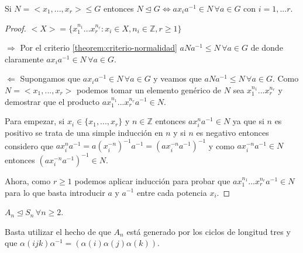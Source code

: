 \begin{proposition}
Si $N = <x_1,...,x_r>  \le G$ entonces $N \unlhd G \iff ax_ia^{-1} \in N \, \forall a \in G$ con $i = 1,...r$.
\end{proposition}
\begin{proof}
$<X> = \{x_1^{n_1}...x_r^{n_r}:x_i \in X,n_i \in \mathbb{Z},r \ge 1\}$

$\Rightarrow$ Por el criterio \ref{theorem:criterio-normalidad} $aNa^{-1} \le N \, \forall a \in G$ de donde claramente $ax_ia^{-1} \in N \, \forall a \in G$.

$\Leftarrow$ Supongamos que $ax_ia^{-1} \in N \, \forall a \in G$ y veamos que $aNa^{-1} \le N \, \forall a \in G$. Como $N = <x_1,...,x_r>$ podemos tomar un elemento genérico de $N$ sea $x_1^{n_1}...x_r^{n_r}$ y demostrar que el producto $ax_1^{n_1}...x_r^{n_r}a^{-1} \in N$.

Para empezar, si $x_i \in \{x_1,...,x_r\}$ y $n \in \mathbb{Z}$ entonces $ax_i^na^{-1} \in N$ ya que si $n$ es positivo se trata de una simple inducción en $n$ y si $n$ es negativo entonces considero que $ax_i^na^{-1} = a(x_i^{-n})^{-1}a^{-1} = (ax_i^{-n}a^{-1})^{-1}$ y como $ax_i^{-n}a^{-1} \in N$ entonces $(ax_i^{-n}a^{-1})^{-1} \in N$.

Ahora, como $r \ge 1$ podemos aplicar inducción para probar que $ax_1^{n_1}...x_r^{n_r}a^{-1} \in N$ para lo que basta introducir $a$ y $a^{-1}$ entre cada potencia $x_i$.
\end{proof}

\begin{example}
$A_n \trianglelefteq S_n \, \forall n \geq 2$.

Basta utilizar el hecho de que $A_n$ está generado por los ciclos de longitud tres y que $\alpha (ijk) \alpha^{-1} = (\alpha(i)\alpha(j)\alpha(k))$.
\end{example}

